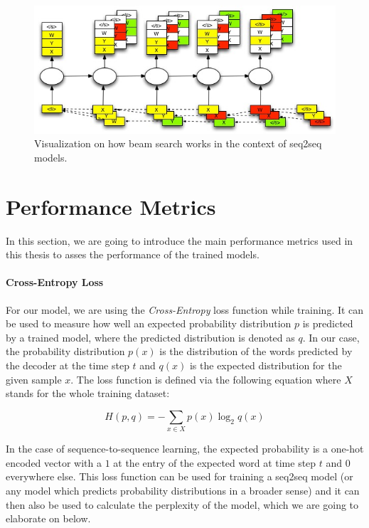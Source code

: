 \begin{figure}[H]
	\label{fundamentals:seq2seq:beam_search}
	\centering
	\includegraphics[width=12cm]{img/beam_search_visualization}
	\caption{Visualization on how beam search works in the context of seq2seq models.\protect\footnotemark}
\end{figure}

\section{Performance Metrics}
In this section, we are going to introduce the main performance metrics used in this thesis to asses the performance of the trained models.

\paragraph{Cross-Entropy Loss} For our model, we are using the \emph{Cross-Entropy} loss function while training. It can be used to measure how well an expected probability distribution $p$ is predicted by a trained model, where the predicted distribution is denoted as $q$. In our case, the probability distribution $p(x)$ is the distribution of the words predicted by the decoder at the time step $t$ and $q(x)$ is the expected distribution for the given sample $x$. The loss function is defined via the following equation where $X$ stands for the whole training dataset:

\begin{equation}
H(p, q) = -\sum_{x \in X} p(x) \log_2 q(x)
\end{equation}

In the case of sequence-to-sequence learning, the expected probability is a one-hot encoded vector with a $1$ at the entry of the expected word at time step $t$ and $0$ everywhere else. This loss function can be used for training a seq2seq model (or any model which predicts probability distributions in a broader sense) and it can then also be used to calculate the perplexity of the model, which we are going to elaborate on below.

